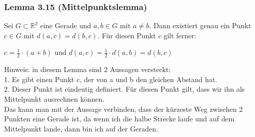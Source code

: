 \documentclass{article}
\begin{document}
\subsubsection*{Lemma 3.15 (Mittelpunktslemma)}
Sei $G \subset \mathbb{R}^2$ eine Gerade und $a,b \in G$ mit $a \neq b$. Dann existiert genau ein Punkt $c \in G$ mit $d(a,c) = d(b,c)$.
Für diesen Punkt $c$ gilt ferner: \\
\begin{center}
    $c = \frac{1}{2} \cdot (a+b)$
    und 
    $d(a,c) = \frac{1}{2} \cdot d(a,b) = d(b,c)$
\end{center}
Hinweis: in diesem Lemma sind 2 Aussagen versteckt: \\
1. Es gibt einen Punkt c, der von a und b den gleichen Abstand hat. \\
2. Dieser Punkt ist eindeutig definiert. Für diesen Punkt gilt, dass wir ihn als Mittelpunkt ausrechnen können. \\
Das kann man mit der Aussage verbinden, dass der kürzeste Weg zwischen 2 Punkten eine Gerade ist, da wenn ich die halbe Strecke laufe und auf dem Mittelpunkt lande, dann bin ich auf der Geraden. \\
\\
\end{document}
